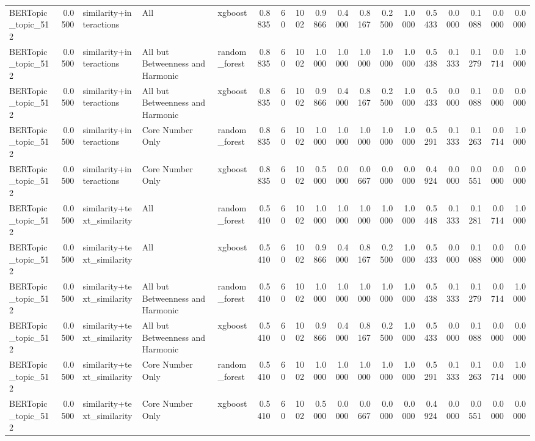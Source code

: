 \begin{tabular}{lrlllrrrrrrrrrrrrr}
BERTopic_topic_512 & 0.0500 & similarity+interactions & All & xgboost & 0.8835 & 60 & 1002 & 0.9866 & 0.4000 & 0.8167 & 0.2500 & 1.0000 & 0.5433 & 0.0000 & 0.1088 & 0.0000 & 0.0000 \\
BERTopic_topic_512 & 0.0500 & similarity+interactions & All but Betweenness and Harmonic & random_forest & 0.8835 & 60 & 1002 & 1.0000 & 1.0000 & 1.0000 & 1.0000 & 1.0000 & 0.5438 & 0.1333 & 0.1279 & 0.0714 & 1.0000 \\
BERTopic_topic_512 & 0.0500 & similarity+interactions & All but Betweenness and Harmonic & xgboost & 0.8835 & 60 & 1002 & 0.9866 & 0.4000 & 0.8167 & 0.2500 & 1.0000 & 0.5433 & 0.0000 & 0.1088 & 0.0000 & 0.0000 \\
BERTopic_topic_512 & 0.0500 & similarity+interactions & Core Number Only & random_forest & 0.8835 & 60 & 1002 & 1.0000 & 1.0000 & 1.0000 & 1.0000 & 1.0000 & 0.5291 & 0.1333 & 0.1263 & 0.0714 & 1.0000 \\
BERTopic_topic_512 & 0.0500 & similarity+interactions & Core Number Only & xgboost & 0.8835 & 60 & 1002 & 0.5000 & 0.0000 & 0.0667 & 0.0000 & 0.0000 & 0.4924 & 0.0000 & 0.0551 & 0.0000 & 0.0000 \\
BERTopic_topic_512 & 0.0500 & similarity+text_similarity & All & random_forest & 0.5410 & 60 & 1002 & 1.0000 & 1.0000 & 1.0000 & 1.0000 & 1.0000 & 0.5448 & 0.1333 & 0.1281 & 0.0714 & 1.0000 \\
BERTopic_topic_512 & 0.0500 & similarity+text_similarity & All & xgboost & 0.5410 & 60 & 1002 & 0.9866 & 0.4000 & 0.8167 & 0.2500 & 1.0000 & 0.5433 & 0.0000 & 0.1088 & 0.0000 & 0.0000 \\
BERTopic_topic_512 & 0.0500 & similarity+text_similarity & All but Betweenness and Harmonic & random_forest & 0.5410 & 60 & 1002 & 1.0000 & 1.0000 & 1.0000 & 1.0000 & 1.0000 & 0.5438 & 0.1333 & 0.1279 & 0.0714 & 1.0000 \\
BERTopic_topic_512 & 0.0500 & similarity+text_similarity & All but Betweenness and Harmonic & xgboost & 0.5410 & 60 & 1002 & 0.9866 & 0.4000 & 0.8167 & 0.2500 & 1.0000 & 0.5433 & 0.0000 & 0.1088 & 0.0000 & 0.0000 \\
BERTopic_topic_512 & 0.0500 & similarity+text_similarity & Core Number Only & random_forest & 0.5410 & 60 & 1002 & 1.0000 & 1.0000 & 1.0000 & 1.0000 & 1.0000 & 0.5291 & 0.1333 & 0.1263 & 0.0714 & 1.0000 \\
BERTopic_topic_512 & 0.0500 & similarity+text_similarity & Core Number Only & xgboost & 0.5410 & 60 & 1002 & 0.5000 & 0.0000 & 0.0667 & 0.0000 & 0.0000 & 0.4924 & 0.0000 & 0.0551 & 0.0000 & 0.0000 \\

\end{tabular}
